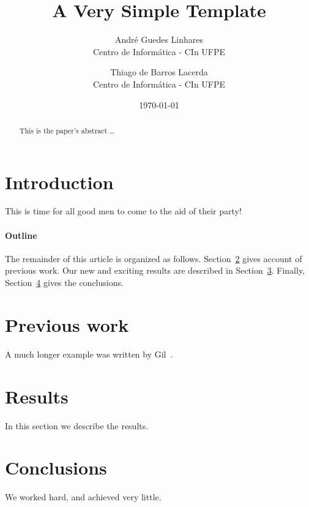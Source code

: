 \documentclass[12pt]{article}
\title{A Very Simple \LaTeXe{} Template}
\author{
        André Guedes Linhares\\
        Centro de Informática - CIn UFPE\\
            \and
        Thiago de Barros Lacerda\\
        Centro de Informática - CIn UFPE\\
}
\date{\today}
\begin{document}
\maketitle

\begin{abstract}
This is the paper's abstract \ldots
\end{abstract}

\section{Introduction}
This is time for all good men to come to the aid of their party!

\paragraph{Outline}
The remainder of this article is organized as follows.
Section~\ref{previous work} gives account of previous work.
Our new and exciting results are described in Section~\ref{results}.
Finally, Section~\ref{conclusions} gives the conclusions.

\section{Previous work}\label{previous work}
A much longer \LaTeXe{} example was written by Gil~\cite{Einstein}.

\section{Results}\label{results}
In this section we describe the results.

\section{Conclusions}\label{conclusions}
We worked hard, and achieved very little.



\end{document}
